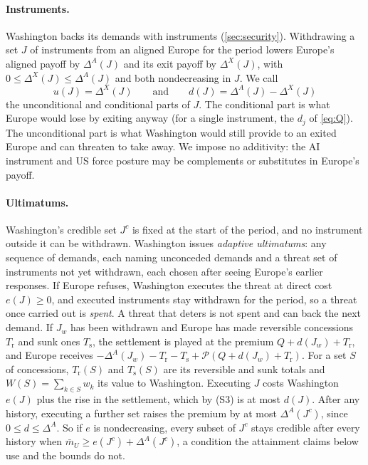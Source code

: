 \paragraph{Instruments.} Washington backs its demands with instruments (\cref{sec:security}). Withdrawing a set $J$ of instruments from an aligned Europe for the period lowers Europe's aligned payoff by $\Delta^A(J)$ and its exit payoff by $\Delta^X(J)$, with $0\le\Delta^X(J)\le\Delta^A(J)$ and both nondecreasing in $J$. We call
\[
u(J)=\Delta^X(J)\qquad\text{and}\qquad d(J)=\Delta^A(J)-\Delta^X(J)
\]
the unconditional and conditional parts of $J$. The conditional part is what Europe would lose by exiting anyway (for a single instrument, the $d_j$ of \cref{eq:Q}). The unconditional part is what Washington would still provide to an exited Europe and can threaten to take away. We impose no additivity: the AI instrument and US force posture may be complements or substitutes in Europe's payoff.

\paragraph{Ultimatums.} Washington's credible set $J^c$ is fixed at the start of the period, and no instrument outside it can be withdrawn. Washington issues \emph{adaptive ultimatums}: any sequence of demands, each naming unconceded demands and a threat set of instruments not yet withdrawn, each chosen after seeing Europe's earlier responses. If Europe refuses, Washington executes the threat at direct cost $e(J)\ge 0$, and executed instruments stay withdrawn for the period, so a threat once carried out is \emph{spent}. A threat that deters is not spent and can back the next demand. If $J_w$ has been withdrawn and Europe has made reversible concessions $T_{\mathrm r}$ and sunk ones $T_{\mathrm s}$, the settlement is played at the premium $Q+d(J_w)+T_{\mathrm r}$, and Europe receives $-\Delta^A(J_w)-T_{\mathrm r}-T_{\mathrm s}+\mathcal P(Q+d(J_w)+T_{\mathrm r})$. For a set $S$ of concessions, $T_{\mathrm r}(S)$ and $T_{\mathrm s}(S)$ are its reversible and sunk totals and $W(S)=\sum_{k\in S}w_k$ its value to Washington. Executing $J$ costs Washington $e(J)$ plus the rise in the settlement, which by (S3) is at most $d(J)$. After any history, executing a further set raises the premium by at most $\Delta^A(J^c)$, since $0\le d\le\Delta^A$. So if $e$ is nondecreasing, every subset of $J^c$ stays credible after every history when $\bar m_U\ge e(J^c)+\Delta^A(J^c)$, a condition the attainment claims below use and the bounds do not.

